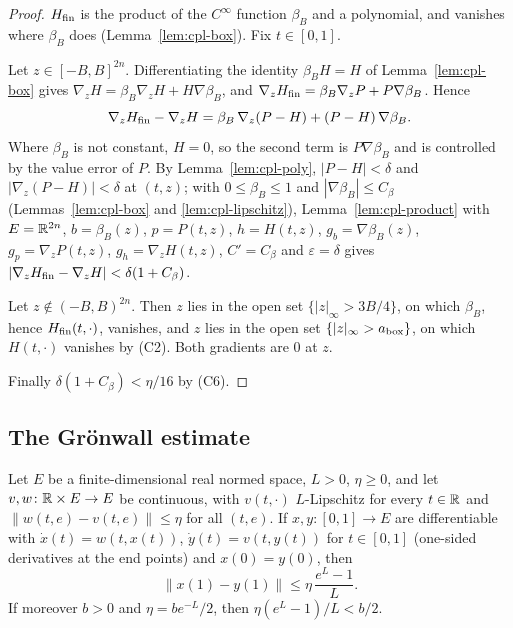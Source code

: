 \begin{proof}
$H_{\mathrm{fin}}$ is the product of the $C^\infty$ function $\beta_B$ and a polynomial, and vanishes where $\beta_B$ does
(Lemma~\ref{lem:cpl-box}). Fix $t\in[0,1]$.

Let $z\in[-B,B]^{2n}$. Differentiating the identity $\beta_BH=H$ of Lemma~\ref{lem:cpl-box} gives
$\nabla_zH=\beta_B\nabla_zH+H\nabla\beta_B$, and $\nabla_zH_{\mathrm{fin}}=\beta_B\nabla_zP+P\nabla\beta_B$. Hence
\[
 \nabla_zH_{\mathrm{fin}}-\nabla_zH=\beta_B\,\nabla_z(P-H)+(P-H)\,\nabla\beta_B .
\]
Where $\beta_B$ is not constant, $H=0$, so the second term is $P\nabla\beta_B$ and is controlled by the value error
of $P$. By Lemma~\ref{lem:cpl-poly}, $|P-H|<\delta$ and $|\nabla_z(P-H)|<\delta$ at $(t,z)$; with $0\le\beta_B\le1$
and $|\nabla\beta_B|\le C_\beta$ (Lemmas~\ref{lem:cpl-box} and \ref{lem:cpl-lipschitz}), Lemma~\ref{lem:cpl-product}
with $E=\mathbb{R}^{2n}$, $b=\beta_B(z)$, $p=P(t,z)$, $h=H(t,z)$, $g_b=\nabla\beta_B(z)$, $g_p=\nabla_zP(t,z)$,
$g_h=\nabla_zH(t,z)$, $C'=C_\beta$ and $\varepsilon=\delta$ gives $|\nabla_zH_{\mathrm{fin}}-\nabla_zH|<\delta(1+C_\beta)$.

Let $z\notin(-B,B)^{2n}$. Then $z$ lies in the open set $\{|z|_\infty>3B/4\}$, on which $\beta_B$, hence
$H_{\mathrm{fin}}(t,\cdot)$, vanishes, and $z$ lies in the open set $\{|z|_\infty>a_{\rm box}\}$, on which $H(t,\cdot)$ vanishes
by (C2). Both gradients are $0$ at $z$.

Finally $\delta(1+C_\beta)<\eta/16$ by (C6).
\end{proof}

\subsection{The Gr\"onwall estimate}\label{sec:cpl-gronwall}

\begin{lemma}[Gr\"onwall]\label{lem:cpl-gronwall-abstract}
Let $E$ be a finite-dimensional real normed space, $L>0$, $\eta\ge0$, and let $v,w\colon\mathbb{R}\times E\to E$ be
continuous, with $v(t,\cdot)$ $L$-Lipschitz for every $t\in\mathbb{R}$ and $\|w(t,e)-v(t,e)\|\le\eta$ for all $(t,e)$. If
$x,y\colon[0,1]\to E$ are differentiable with $\dot x(t)=w(t,x(t))$, $\dot y(t)=v(t,y(t))$ for $t\in[0,1]$
(one-sided derivatives at the end points) and $x(0)=y(0)$, then
\[
 \|x(1)-y(1)\|\le\eta\,\frac{e^L-1}L .
\]
If moreover $b>0$ and $\eta=be^{-L}/2$, then $\eta(e^L-1)/L<b/2$.
\end{lemma}

